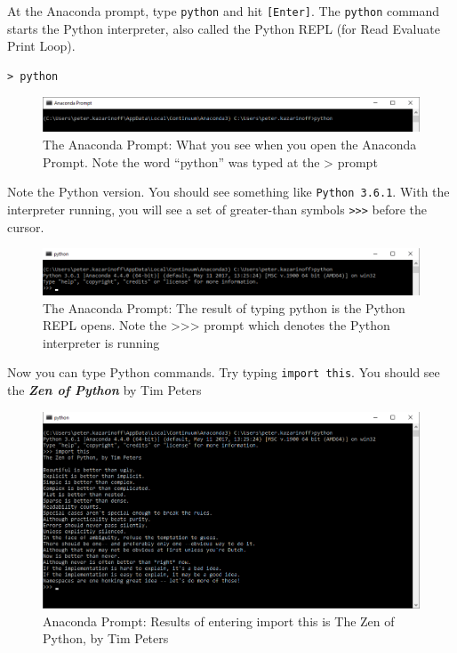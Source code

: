 \documentclass{book}
\makeatletter
\def\maxwidth{\ifdim\Gin@nat@width>\linewidth\linewidth
    \else\Gin@nat@width\fi}
\let\Oldincludegraphics\includegraphics
\renewcommand{\includegraphics}[1]{\Oldincludegraphics[width=.8\maxwidth]{#1}}
\makeatother
\begin{document}
At the Anaconda prompt, type \lstinline!python! and hit
\lstinline![Enter]!. The \lstinline!python! command starts the Python
interpreter, also called the Python REPL (for Read Evaluate Print Loop).

\begin{lstlisting}
> python
\end{lstlisting}

\begin{figure}
\centering
\includegraphics{images/conda_prompt_type_python.png}
\caption{The Anaconda Prompt: What you see when you open the Anaconda
Prompt. Note the word ``python'' was typed at the \textgreater{} prompt}
\end{figure}

Note the Python version. You should see something like
\lstinline!Python 3.6.1!. With the interpreter running, you will see a
set of greater-than symbols \lstinline!>>>! before the cursor.

\begin{figure}
\centering
\includegraphics{images/conda_type_python.png}
\caption{The Anaconda Prompt: The result of typing python is the Python
REPL opens. Note the \textgreater{}\textgreater{}\textgreater{} prompt
which denotes the Python interpreter is running}
\end{figure}

Now you can type Python commands. Try typing \lstinline!import this!.
You should see the \textbf{\emph{Zen of Python}} by Tim Peters

\begin{figure}
\centering
\includegraphics{images/conda_import_this_output.png}
\caption{Anaconda Prompt: Results of entering import this is The Zen of
Python, by Tim Peters}
\end{figure}
\end{document}
